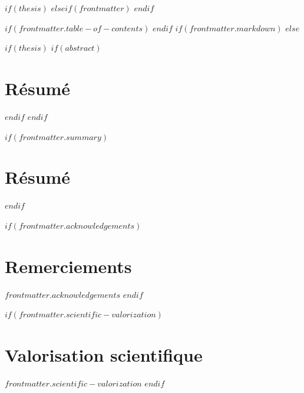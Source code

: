 $if(thesis)$
\setcounter{page}{1}
$elseif(frontmatter)$
\setcounter{page}{1}
$endif$

$if(frontmatter.table-of-contents)$
\hussoncustomfrontmattertrue
$endif$
$if(frontmatter.markdown)$
\hussoncustomfrontmattertrue
$else$

$if(thesis)$
$if(abstract)$
\clearpage
\section*{Résumé}
\vspace{0.25\baselineskip}
\begin{center}
\setlength{\fboxsep}{14pt}
\setlength{\fboxrule}{0.6pt}
\end{center}
$endif$
$endif$

$if(frontmatter.summary)$
\clearpage
\section*{Résumé}
\vspace{0.25\baselineskip}
\begin{center}
\setlength{\fboxsep}{14pt}
\setlength{\fboxrule}{0.6pt}
\end{center}
$endif$

$if(frontmatter.acknowledgements)$
\clearpage
\section*{Remerciements}
$frontmatter.acknowledgements$
$endif$

$if(frontmatter.scientific-valorization)$
\clearpage
\section*{Valorisation scientifique}
$frontmatter.scientific-valorization$
$endif$

